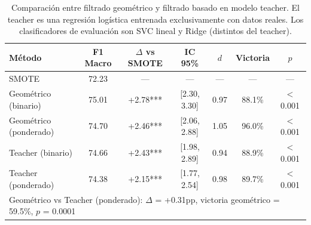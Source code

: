 \begin{table}[htbp]
\centering
\small
\caption{Comparación entre filtrado geométrico y filtrado basado en modelo teacher. El teacher es una regresión logística entrenada exclusivamente con datos reales. Los clasificadores de evaluación son SVC lineal y Ridge (distintos del teacher).}
\label{tab:teacher_vs_geometric}
\begin{tabular}{lcccccc}
\toprule
\textbf{Método} & \textbf{F1 Macro} & \textbf{$\Delta$ vs SMOTE} & \textbf{IC 95\%} & \textbf{$d$} & \textbf{Victoria} & \textbf{$p$} \\
\midrule
SMOTE & 72.23 & --- & --- & --- & --- & --- \\
Geométrico (binario) & 75.01 & +2.78*** & [2.30, 3.30] & 0.97 & 88.1\% & $<$0.001 \\
Geométrico (ponderado) & 74.70 & +2.46*** & [2.06, 2.88] & 1.05 & 96.0\% & $<$0.001 \\
Teacher (binario) & 74.66 & +2.43*** & [1.98, 2.89] & 0.94 & 88.9\% & $<$0.001 \\
Teacher (ponderado) & 74.38 & +2.15*** & [1.77, 2.54] & 0.98 & 89.7\% & $<$0.001 \\
\midrule
\multicolumn{7}{l}{\small Geométrico vs Teacher (ponderado): $\Delta$ = +0.31pp, victoria geométrico = 59.5\%, $p$ = 0.0001} \\
\bottomrule
\end{tabular}
\end{table}